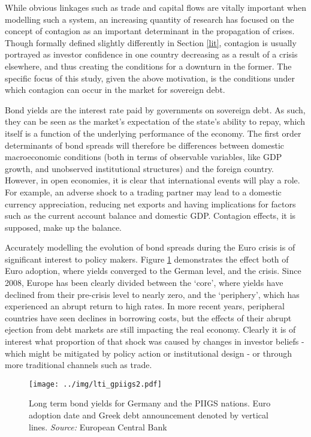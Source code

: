 \documentclass[/../base.tex]{subfiles}
\begin{document}
While obvious linkages such as trade and capital flows are vitally important when modelling such a system, an increasing quantity of research has focused on the concept of contagion as an important determinant in the propagation of crises. Though formally defined slightly differently in Section \ref{lit}, contagion is usually portrayed as investor confidence in one country decreasing as a result of a crisis elsewhere, and thus creating the conditions for a downturn in the former. The specific focus of this study, given the above motivation, is the conditions under which contagion can occur in the market for sovereign debt.

Bond yields are the interest rate paid by governments on sovereign debt. As such, they can be seen as the market's expectation of the state's ability to repay, which itself is a function of the underlying performance of the economy. The first order determinants of bond spreads will therefore be differences between domestic macroeconomic conditions (both in terms of observable variables, like GDP growth, and unobserved institutional structures) and the foreign country. However, in open economies, it is clear that international events will play a role. For example, an adverse shock to a trading partner may lead to a domestic currency appreciation, reducing net exports and having implications for factors such as the current account balance and domestic GDP. Contagion effects, it is supposed, make up the balance.

Accurately modelling the evolution of bond spreads during the Euro crisis is of significant interest to policy makers. Figure \ref{fig:lit_gpiigs} demonstrates the effect both of Euro adoption, where yields converged to the German level, and the crisis. Since 2008, Europe has been clearly divided between the `core', where yields have declined from their pre-crisis level to nearly zero, and the `periphery', which has experienced an abrupt return to high rates. In more recent years, peripheral countries have seen declines in borrowing costs, but the effects of their abrupt ejection from debt markets are still impacting the real economy. Clearly it is of interest what proportion of that shock was caused by changes in investor beliefs - which might be mitigated by policy action or institutional design - or through more traditional channels such as trade.

\begin{figure}
	\centering
	\texttt{[image: ../img/lti\_gpiigs2.pdf]}
	\caption{Long term bond yields for Germany and the PIIGS nations. Euro adoption date and Greek debt announcement denoted by vertical lines. \textit{Source:} European Central Bank}
	\label{fig:lit_gpiigs}
\end{figure}
\end{document}
